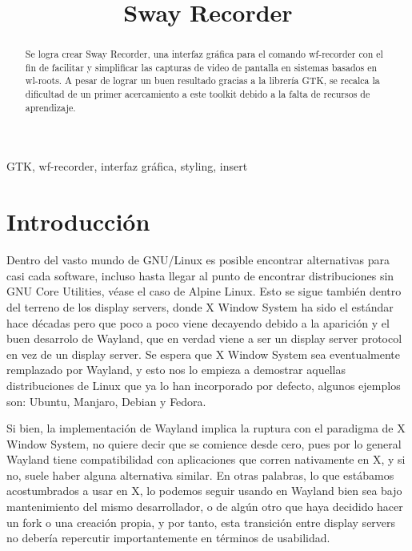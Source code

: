 \documentclass[conference]{IEEEtran}
\begin{document}
\title{Sway Recorder
}

\author{
}

\maketitle

\begin{abstract}
Se logra crear Sway Recorder, una interfaz gráfica para el comando wf-recorder con el fin de facilitar y simplificar las capturas de video de pantalla en sistemas basados en wl-roots. A pesar de lograr un buen resultado gracias a la librería GTK, se recalca la dificultad de un primer acercamiento a este toolkit debido a la falta de recursos de aprendizaje.
\end{abstract}

\begin{IEEEkeywords}
GTK, wf-recorder, interfaz gráfica, styling, insert
\end{IEEEkeywords}

\section{Introducción}
Dentro del vasto mundo de GNU/Linux es posible encontrar alternativas para casi cada software, incluso hasta llegar al punto de encontrar distribuciones sin GNU Core Utilities, véase el caso de Alpine Linux\cite{b1}. Esto se sigue también dentro del terreno de los display servers, donde X Window System ha sido el estándar hace décadas\cite{b2} pero que poco a poco viene decayendo debido a la aparición y el buen desarrolo de Wayland, que en verdad viene a ser un display server protocol en vez de un display server. Se espera
que X Window System sea eventualmente remplazado por Wayland\cite{b3}, y esto nos lo empieza a demostrar aquellas distribuciones de Linux que ya lo han incorporado por defecto, algunos ejemplos son: Ubuntu, Manjaro, Debian y Fedora\cite{b4}.

Si bien, la implementación de Wayland implica la ruptura con el paradigma de X Window System, no quiere decir que se comience desde cero, pues por lo general Wayland tiene compatibilidad con aplicaciones que corren nativamente en X, y si no, suele haber alguna alternativa similar. En otras palabras, lo que estábamos acostumbrados a usar en X, lo podemos seguir usando en Wayland bien sea bajo mantenimiento del mismo
desarrollador, o de algún otro que haya decidido hacer un fork o una creación propia, y por tanto, esta transición entre display servers no debería repercutir importantemente en términos de usabilidad.
\end{document}
